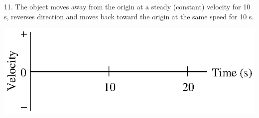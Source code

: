 11. The object moves away from the origin at a steady (constant) velocity for
10 s, reverses direction and moves back toward the origin at the same speed
for 10 s.

\vspace{0.3cm}
{\par\centering \includegraphics{velocity/velocity_fig16.eps} \par}
\vspace{0.3cm}

